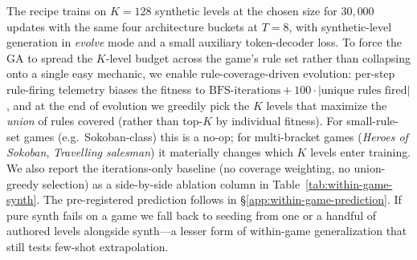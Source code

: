 The recipe trains on $K{=}128$ synthetic levels at the chosen size for
$30{,}000$ updates with the same four architecture buckets at $T{=}8$,
with synthetic-level generation in \emph{evolve} mode and a small
auxiliary token-decoder loss. To force the GA to spread the $K$-level
budget across the game's rule set rather than collapsing onto a single
easy mechanic, we enable rule-coverage-driven evolution: per-step
rule-firing telemetry biases the fitness to
$\text{BFS-iterations} + 100 \cdot |\text{unique rules fired}|$, and
at the end of evolution we greedily pick the $K$ levels that maximize
the \emph{union} of rules covered (rather than top-$K$ by individual
fitness). For small-rule-set games (e.g.\ Sokoban-class) this is a
no-op; for multi-bracket games (\textit{Heroes of Sokoban},
\textit{Travelling salesman}) it materially changes which $K$ levels enter
training. We also report the iterations-only baseline (no coverage
weighting, no union-greedy selection) as a side-by-side ablation
column in Table~\ref{tab:within-game-synth}. The pre-registered
prediction follows in \S\ref{app:within-game-prediction}. If pure
synth fails on a game we fall back to seeding from one or a handful
of authored levels alongside synth---a lesser form of within-game
generalization that still tests few-shot extrapolation.



